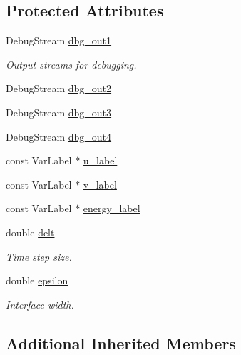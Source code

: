 \subsection*{Protected Attributes}
\begin{DoxyCompactItemize}
\item 
Debug\+Stream \hyperlink{classUintah_1_1PhaseField_1_1Benchmark04_ab80237c1fc2a53f18e89d9f893302af6}{dbg\+\_\+out1}
\begin{DoxyCompactList}\small\item\em Output streams for debugging. \end{DoxyCompactList}\item 
Debug\+Stream \hyperlink{classUintah_1_1PhaseField_1_1Benchmark04_a86773fa68e6182b0510cba50697e5362}{dbg\+\_\+out2}
\item 
Debug\+Stream \hyperlink{classUintah_1_1PhaseField_1_1Benchmark04_a462ce7657a1aa9ae2b064184f0c4fa43}{dbg\+\_\+out3}
\item 
Debug\+Stream \hyperlink{classUintah_1_1PhaseField_1_1Benchmark04_a9b4f5cc408e023b7da51600d83889ccb}{dbg\+\_\+out4}
\item 
const Var\+Label $\ast$ \hyperlink{classUintah_1_1PhaseField_1_1Benchmark04_a440d44ec4e99753872e418be27bc445e}{u\+\_\+label}
\item 
const Var\+Label $\ast$ \hyperlink{classUintah_1_1PhaseField_1_1Benchmark04_adb064f99ad9fd107d25f571e800fce74}{v\+\_\+label}
\item 
const Var\+Label $\ast$ \hyperlink{classUintah_1_1PhaseField_1_1Benchmark04_a859dfe60c1cdc737d9866c422fe4ea64}{energy\+\_\+label}
\item 
double \hyperlink{classUintah_1_1PhaseField_1_1Benchmark04_ac31e3ea43d9b64dd5a02338cef941888}{delt}
\begin{DoxyCompactList}\small\item\em Time step size. \end{DoxyCompactList}\item 
double \hyperlink{classUintah_1_1PhaseField_1_1Benchmark04_a913523316117dd168d9645d8430e1e07}{epsilon}
\begin{DoxyCompactList}\small\item\em Interface width. \end{DoxyCompactList}\end{DoxyCompactItemize}
\subsection*{Additional Inherited Members}


